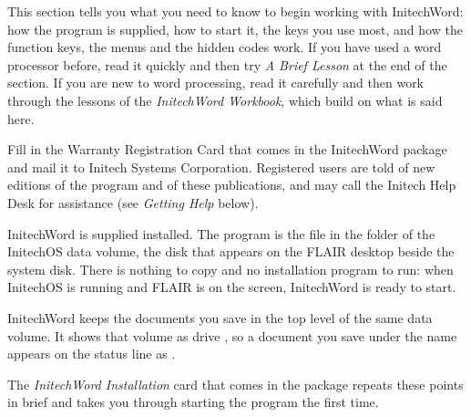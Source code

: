 This section tells you what you need to know to begin working with
InitechWord: how the program is supplied, how to start it, the keys you use
most, and how the function keys, the menus and the hidden codes work.  If
you have used a word processor before, read it quickly and then try
\textit{A Brief Lesson} at the end of the section.  If you are new to word
processing, read it carefully and then work through the lessons of the
\textit{InitechWord Workbook}, which build on what is said here.

Fill in the Warranty Registration Card that comes in the InitechWord
package and mail it to Initech Systems Corporation.  Registered users are
told of new editions of the program and of these publications, and may call
the Initech Help Desk for assistance (see \textit{Getting Help} below).

InitechWord is supplied installed.  The program is the file
 in the  folder of the InitechOS data volume, the
disk that appears on the FLAIR desktop beside the system disk.  There is
nothing to copy and no installation program to run: when InitechOS is
running and FLAIR is on the screen, InitechWord is ready to start.

InitechWord keeps the documents you save in the top level of the same data
volume.  It shows that volume as drive , so a document you save
under the name  appears on the status line as
.

The \textit{InitechWord Installation} card that comes in the package
repeats these points in brief and takes you through starting the program
the first time.

